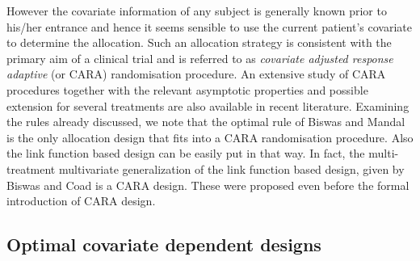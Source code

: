 However the covariate information of any subject is generally known prior to his/her entrance and hence it seems sensible to use the current patient's covariate to determine the allocation. Such an allocation strategy is consistent with the primary aim of a clinical trial and is referred to as \textit{covariate adjusted response adaptive} (or CARA) randomisation procedure\cite{14}. An extensive study of CARA procedures together with the relevant asymptotic properties and possible extension for several treatments are also available in recent literature\cite{63,64}. Examining the rules already discussed, we note that the optimal rule of Biswas and Mandal\cite{44} is the only allocation design that fits into a CARA randomisation procedure. Also the link function based design can be easily put in that way. In fact, the multi-treatment multivariate generalization of the link function based design, given by Biswas and Coad\cite{61} is a CARA design. These\cite{44,61} were proposed even before the formal introduction of CARA design\cite{14}.


\subsection{Optimal covariate dependent designs}

